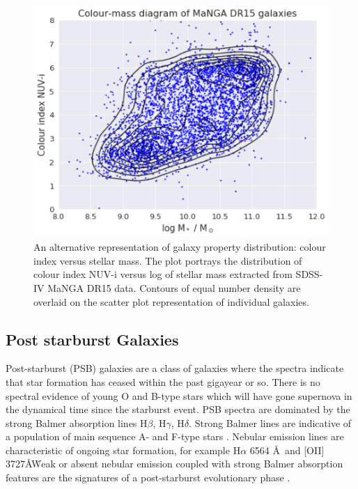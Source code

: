 \begin{figure}
    \centering
    \includegraphics[width=\columnwidth]{images/CMDs/CMD-DR15-ALL-CONTOUR-TIX.png}
    \caption[Colour-mass diagram of the complete MaNGA DR15 galaxy population]{An alternative representation of galaxy property distribution: colour index versus stellar mass. The plot portrays the distribution of colour index NUV-i versus log of stellar mass extracted from SDSS-IV MaNGA DR15 data. Contours of equal number density are overlaid on the scatter plot representation of individual galaxies.}
    \label{fig:CMD-mass-1}
\end{figure}

\subsection{Post starburst Galaxies}
\label{post-starburst-galaxies}
Post-starburst (PSB) galaxies are a class of galaxies where the spectra indicate that star formation has ceased within the past gigayear or so. There is no spectral evidence of young O and B-type stars which will have gone supernova in the dynamical time since the starburst event. PSB spectra are dominated by the strong Balmer absorption lines H$\beta$, H$\gamma$, H$\delta$. Strong Balmer lines are indicative of a population of main sequence A- and F-type stars \citep{1997A&A...325.1025P}. Nebular emission lines are characteristic of ongoing star formation, for example H$\alpha$ 6564 \AA\ and [OII] 3727\AA\. Weak or absent nebular emission coupled with strong Balmer absorption features are the signatures of a post-starburst evolutionary phase \citep{2001ApJ...547L..17B,2003PASJ...55..771G,2004MNRAS.355..713B,2005MNRAS.357..937G,2018MNRAS.477.1708P}. 

